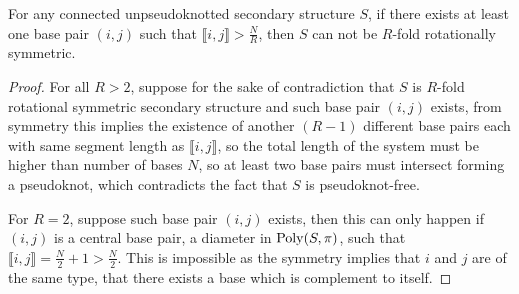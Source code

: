 \begin{lemma} \label{lem:nobase}
	For any connected unpseudoknotted secondary structure $S$, if there exists at least one base pair $(i,j)$ such that $\llbracket i,j \rrbracket > \frac{N}{R}$, then $S$ can not be  $R$-fold rotationally symmetric. 
\end{lemma}
\begin{proof}
	For all $R>2$, suppose for the sake of contradiction that $S$ is $R$-fold rotational symmetric secondary structure and such base pair $(i,j)$ exists, from symmetry this implies the existence of another $(R-1)$ different base pairs each with same segment length as $\llbracket i,j \rrbracket$, so the total length of the system must be higher than number of bases $N$, so at least two base pairs must intersect forming a pseudoknot, which contradicts the fact that $S$ is pseudoknot-free. 
	
	For $R=2$, suppose such base pair $(i,j)$ exists, then this can only happen if $(i,j)$ is a central base pair, a diameter in $\mathrm{Poly}(S,\pi)$, such that $\llbracket i,j \rrbracket = \frac{N}{2}+1 >  \frac{N}{2}$. This is impossible as the symmetry implies that $i$ and $j$ are of the same type, that there exists a base which is complement to itself.  
\end{proof}



